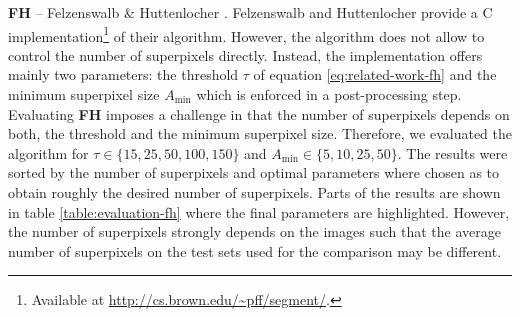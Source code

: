 \textbf{FH} -- Felzenswalb \& Huttenlocher \cite{FelzenswalbHuttenlocher:2004}. Felzenswalb and Huttenlocher provide a C implementation\footnote{Available at \url{http://cs.brown.edu/~pff/segment/}.} of their algorithm. However, the algorithm does not allow to control the number of superpixels directly. Instead, the implementation offers mainly two parameters: the threshold $\tau$ of equation \eqref{eq:related-work-fh} and the minimum superpixel size $A_{\text{min}}$ which is enforced in a post-processing step. Evaluating \textbf{FH} imposes a challenge in that the number of superpixels depends on both, the threshold and the minimum superpixel size. Therefore, we evaluated the algorithm for $\tau \in \{15,25,50,100,150\}$ and $A_{\text{min}} \in \{5,10,25,50\}$. The results were sorted by the number of superpixels and optimal parameters where chosen as to obtain roughly the desired number of superpixels. Parts of the results are shown in table \ref{table:evaluation-fh} where the final parameters are highlighted. However, the number of superpixels strongly depends on the images such that the average number of superpixels on the test sets used for the comparison may be different. %
